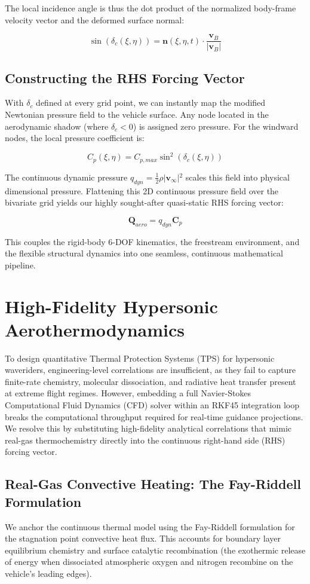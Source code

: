\documentclass[11pt,a4paper]{article}
\theoremstyle{definition}
\numberwithin{equation}{section}
\begin{document}
The local incidence angle is thus the dot product of the normalized body-frame velocity vector and the deformed surface normal:

$$\sin(\delta_c(\xi, \eta)) = \mathbf{n}(\xi, \eta, t) \cdot \frac{\mathbf{v}_B}{\vert{}\mathbf{v}_B\vert{}}$$

\subsection{Constructing the RHS Forcing Vector}
With $\delta_c$ defined at every grid point, we can instantly map the modified Newtonian pressure field to the vehicle surface. Any node located in the aerodynamic shadow (where $\delta_c < 0$) is assigned zero pressure. For the windward nodes, the local pressure coefficient is:

$$C_p(\xi, \eta) = C_{p,max} \sin^2(\delta_c(\xi, \eta))$$

The continuous dynamic pressure $q_{dyn} = \frac{1}{2} \rho \vert{}\mathbf{v}_\infty\vert{}^2$ scales this field into physical dimensional pressure. Flattening this 2D continuous pressure field over the bivariate grid yields our highly sought-after quasi-static RHS forcing vector:

$$\mathbf{Q}_{aero} = q_{dyn} \mathbf{C}_p$$

This couples the rigid-body 6-DOF kinematics, the freestream environment, and the flexible structural dynamics into one seamless, continuous mathematical pipeline.

\section{High-Fidelity Hypersonic Aerothermodynamics}
\label{sec:hypersonic_aerothermodynamics}
To design quantitative Thermal Protection Systems (TPS) for hypersonic waveriders, engineering-level correlations are insufficient, as they fail to capture finite-rate chemistry, molecular dissociation, and radiative heat transfer present at extreme flight regimes. However, embedding a full Navier-Stokes Computational Fluid Dynamics (CFD) solver within an RKF45 integration loop breaks the computational throughput required for real-time guidance projections. We resolve this by substituting high-fidelity analytical correlations that mimic real-gas thermochemistry directly into the continuous right-hand side (RHS) forcing vector.

\subsection{Real-Gas Convective Heating: The Fay-Riddell Formulation}
We anchor the continuous thermal model using the Fay-Riddell formulation for the stagnation point convective heat flux. This accounts for boundary layer equilibrium chemistry and surface catalytic recombination (the exothermic release of energy when dissociated atmospheric oxygen and nitrogen recombine on the vehicle's leading edges).
\end{document}

